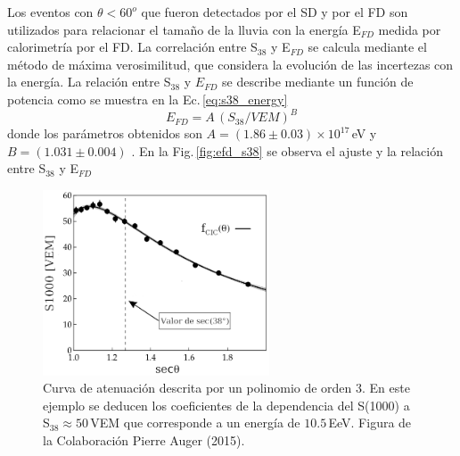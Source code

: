 Los eventos con $\theta<60^o$  que fueron detectados por el SD y por el FD son utilizados para relacionar el tamaño de la lluvia con la energía  E$_{FD}$ medida por calorimetría por el FD.  La correlación entre S$_{38}$ y E$_{FD}$ se calcula mediante el método de máxima verosimilitud, que considera la evolución de las incertezas con la energía. La relación entre S$_{38}$ y $E_{FD}$ se describe mediante un función de potencia como se muestra en la Ec.\,\ref{eq:s38_energy}
\begin{equation}
	E_{FD}= A\, (S_{38}/VEM)^B
	\label{eq:s38_energy}
\end{equation}
donde los parámetros obtenidos son $A=(1.86\pm0.03)\times 10^{17}\,$eV y $B=(1.031\pm0.004)$  \cite{tobepublished}. En la Fig.\,\ref{fig:efd_s38} se observa el ajuste y la relación entre  S$_{38}$ y E$_{FD}$



\begin{figure}[H]
	\centering
	\includegraphics[width=0.6\textwidth]{s1000_theta.png}
	\caption{Curva de atenuación descrita por un polinomio de orden 3. En este ejemplo se deducen los coeficientes de la dependencia del S(1000) a S$_{38}\approx 50\,$VEM que corresponde a un energía de $10.5\,$EeV. Figura de la Colaboración Pierre Auger (2015).} 	\label{fig:s1000_theta}
\end{figure}

